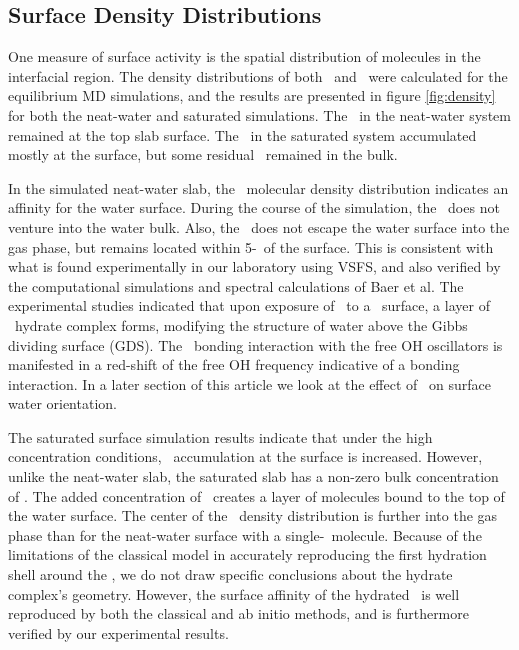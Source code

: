\subsection{Surface Density Distributions}

One measure of surface activity is the spatial distribution of molecules in the interfacial region. The density distributions of both \wat~and \suldiox~were calculated for the equilibrium MD simulations, and the results are presented in figure \ref{fig:density} for both the neat-water and saturated simulations. The \suldiox~in the neat-water system remained at the top slab surface. The \suldiox~in the saturated system accumulated mostly at the surface, but some residual \suldiox~remained in the bulk.



In the simulated neat-water slab, the \suldiox~molecular density distribution indicates an affinity for the water surface. During the course of the simulation, the \suldiox~does not venture into the water bulk. Also, the \suldiox~does not escape the water surface into the gas phase, but remains located within 5-\angs~of the surface. This is consistent with what is found experimentally in our laboratory using VSFS,\cite{Tarbuck2005,Tarbuck2006} and also verified by the computational simulations and spectral calculations of Baer et al.\cite{Baer2010} The experimental studies indicated that upon exposure of \suldiox~to a \wat~surface, a layer of \suldiox~hydrate complex forms, modifying the structure of water above the Gibbs dividing surface (GDS). The \suldiox~bonding interaction with the free OH oscillators is manifested in a red-shift of the free OH frequency indicative of a bonding interaction. In a later section of this article we look at the effect of \suldiox~on surface water orientation.

The saturated surface simulation results indicate that under the high concentration conditions, \suldiox~accumulation at the surface is increased. However, unlike the neat-water slab, the saturated slab has a non-zero bulk concentration of \suldiox. The added concentration of \suldiox~creates a layer of molecules bound to the top of the water surface. The center of the \suldiox~density distribution is further into the gas phase than for the neat-water surface with a single-\suldiox~molecule. Because of the limitations of the classical model in accurately reproducing the first hydration shell around the \suldiox,\cite{Baer2010} we do not draw specific conclusions about the hydrate complex's geometry. However, the surface affinity of the hydrated \suldiox~is well reproduced by both the classical and ab initio methods, and is furthermore verified by our experimental results.

